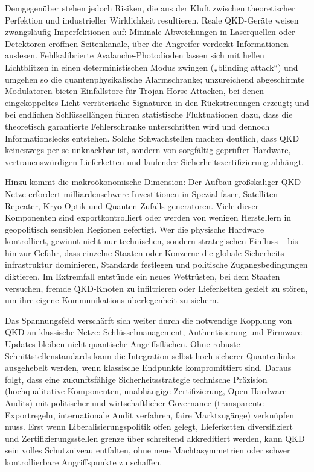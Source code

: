 Demgegenüber stehen jedoch Risiken, die aus der Kluft zwischen theoretischer Perfektion und industrieller Wirklichkeit resultieren. Reale QKD-Geräte weisen zwangsläufig Imperfektionen auf: Mininale Abweichungen in Laserquellen oder Detektoren eröffnen Seitenkanäle, über die Angreifer verdeckt Informationen auslesen. Fehlkalibrierte Avalanche-Photodioden lassen sich mit hellen Lichtblitzen in einen deterministischen Modus zwingen („blinding attack“) und umgehen so die quantenphysikalische Alarmschranke; unzureichend abgeschirmte Modulatoren bieten Einfallstore für Trojan-Horse-Attacken, bei denen eingekoppeltes Licht verräterische Signaturen in den Rückstreuungen erzeugt; und bei endlichen Schlüssellängen führen statistische Fluktuationen dazu, dass die theoretisch garantierte Fehlerschranke unterschritten wird und dennoch Informationslecks entstehen. Solche Schwachstellen machen deutlich, dass QKD keineswegs per se unknackbar ist, sondern von sorgfältig geprüfter Hardware, vertrauenswürdigen Lieferketten und laufender Sicherheitszertifizierung abhängt.

Hinzu kommt die makroökonomische Dimension: Der Aufbau großskaliger QKD-Netze erfordert milliardenschwere Investitionen in Spezial faser, Satelliten-Repeater, Kryo-Optik und Quanten-Zufalls generatoren. Viele dieser Komponenten sind exportkontrolliert oder werden von wenigen Herstellern in geopolitisch sensiblen Regionen gefertigt. Wer die physische Hardware kontrolliert, gewinnt nicht nur technischen, sondern strategischen Einfluss – bis hin zur Gefahr, dass einzelne Staaten oder Konzerne die globale Sicherheits infrastruktur dominieren, Standards festlegen und politische Zugangsbedingungen diktieren. Im Extremfall entstünde ein neues Wettrüsten, bei dem Staaten versuchen, fremde QKD-Knoten zu infiltrieren oder Lieferketten gezielt zu stören, um ihre eigene Kommunikations überlegenheit zu sichern.

Das Spannungsfeld verschärft sich weiter durch die notwendige Kopplung von QKD an klassische Netze: Schlüsselmanagement, Authentisierung und Firmware-Updates bleiben nicht-quantische Angriffsflächen. Ohne robuste Schnittstellenstandards kann die Integration selbst hoch sicherer Quantenlinks ausgehebelt werden, wenn klassische Endpunkte kompromittiert sind. Daraus folgt, dass eine zukunftsfähige Sicherheitsstrategie technische Präzision (hochqualitative Komponenten, unabhängige Zertifizierung, Open-Hardware-Audits) mit politischer und wirtschaftlicher Governance (transparente Exportregeln, internationale Audit verfahren, faire Marktzugänge) verknüpfen muss. Erst wenn Liberalisierungspolitik offen gelegt, Lieferketten diversifiziert und Zertifizierungsstellen grenze über schreitend akkreditiert werden, kann QKD sein volles Schutzniveau entfalten, ohne neue Machtasymmetrien oder schwer kontrollierbare Angriffspunkte zu schaffen. 
\cite{sunReviewSecurityEvaluation2022} 

